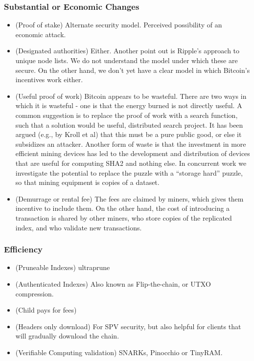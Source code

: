 \subsubsection{Substantial or Economic Changes}
\begin{itemize}
\item (Proof of stake) Alternate security model. Perceived possibility of an economic attack. 
\item (Designated authorities) Either. Another point out is Ripple's approach to unique node lists. We do not understand the model under which these are secure. On the other hand, we don't yet have a clear model in which Bitcoin's incentives work either. 
\item (Useful proof of work) Bitcoin appears to be wasteful. There are two ways in which it is wasteful - one is that the energy burned is not directly useful. A common suggestion is to replace the proof of work with a search function, such that a solution would be useful, distributed search project. It has been argued (e.g., by Kroll et al) that this must be a pure public good, or else it subsidizes an attacker. Another form of waste is that the investment in more efficient mining devices has led to the development and distribution of devices that are useful for computing SHA2 and nothing else. In concurrent work we investigate the potential to replace the puzzle with a ``storage hard'' puzzle, so that mining equipment is copies of a dataset.
\item (Demurrage or rental fee) The fees are claimed by miners, which gives them incentive to include them. On the other hand, the cost of introducing a transaction is shared by other miners, who store copies of the replicated index, and who validate new transactions.
\end{itemize}

\subsubsection{Efficiency}
\begin{itemize}
\item (Pruneable Indexes) ultraprune
\item (Authenticated Indexes) Also known as Flip-the-chain, or UTXO compression.
\item (Child pays for fees)
\item (Headers only download) For SPV security, but also helpful for clients that will gradually download the chain.
\item (Verifiable Computing validation) SNARKs, Pinocchio or TinyRAM.
\end{itemize}

